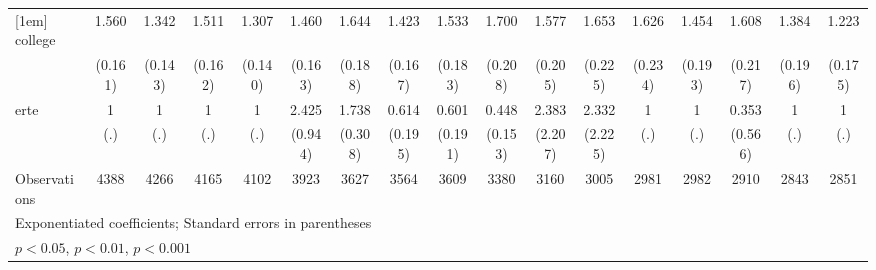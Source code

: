 {\begin{tabular}{l*{16}{c}}
[1em]
college             &       1.560\sym{***}&       1.342\sym{**} &       1.511\sym{***}&       1.307\sym{*}  &       1.460\sym{***}&       1.644\sym{***}&       1.423\sym{**} &       1.533\sym{***}&       1.700\sym{***}&       1.577\sym{***}&       1.653\sym{***}&       1.626\sym{***}&       1.454\sym{**} &       1.608\sym{***}&       1.384\sym{*}  &       1.223         \\
                    &     (0.161)         &     (0.143)         &     (0.162)         &     (0.140)         &     (0.163)         &     (0.188)         &     (0.167)         &     (0.183)         &     (0.208)         &     (0.205)         &     (0.225)         &     (0.234)         &     (0.193)         &     (0.217)         &     (0.196)         &     (0.175)         \\
[1em]
erte                &           1         &           1         &           1         &           1         &       2.425\sym{*}  &       1.738\sym{**} &       0.614         &       0.601         &       0.448\sym{*}  &       2.383         &       2.332         &           1         &           1         &       0.353         &           1         &           1         \\
                    &         (.)         &         (.)         &         (.)         &         (.)         &     (0.944)         &     (0.308)         &     (0.195)         &     (0.191)         &     (0.153)         &     (2.207)         &     (2.225)         &         (.)         &         (.)         &     (0.566)         &         (.)         &         (.)         \\
\hline
Observations        &        4388         &        4266         &        4165         &        4102         &        3923         &        3627         &        3564         &        3609         &        3380         &        3160         &        3005         &        2981         &        2982         &        2910         &        2843         &        2851         \\
\hline\hline
\multicolumn{17}{l}{\footnotesize Exponentiated coefficients; Standard errors in parentheses}\\
\multicolumn{17}{l}{\footnotesize \sym{*} \(p<0.05\), \sym{**} \(p<0.01\), \sym{***} \(p<0.001\)}\\
\end{tabular}
}

